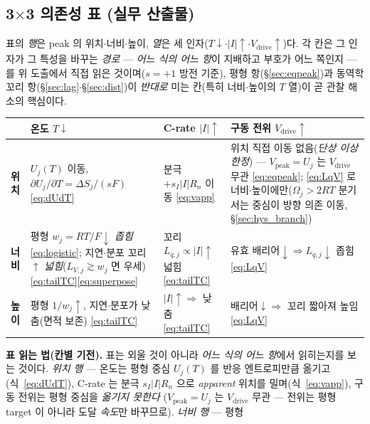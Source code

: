 \documentclass[11pt,a4paper]{article}
\newcommand{\drive}{\mathrm{drive}}
\newcommand{\peak}{\mathrm{peak}}
\begin{document}
\subsection{3$\times$3 의존성 표 (실무 산출물)}
표의 \emph{행}은 peak 의 위치$\cdot$너비$\cdot$높이, \emph{열}은 세 인자($T\downarrow$$\cdot$$|I|\uparrow$$\cdot$$V_\drive\uparrow$)다.
각 칸은 그 인자가 그 특성을 바꾸는 \emph{경로} — \emph{어느 식의 어느 항}이 지배하고 부호가 어느 쪽인지 — 를 위
도출에서 직접 읽은 것이며($s=+1$ 방전 기준), 평형 항(\S\ref{sec:eqpeak})과 동역학 꼬리 항(\S\ref{sec:lag}$\cdot$\S\ref{sec:dist})이
\emph{반대로} 미는 칸(특히 너비$\cdot$높이의 $T$ 열)이 곧 관찰 해소의 핵심이다.
\begin{center}
\renewcommand{\arraystretch}{1.4}
\begin{tabular}{p{} p{} p{} p{}}
\toprule
 & \textbf{온도 $T\downarrow$} & \textbf{C-rate $|I|\uparrow$} & \textbf{구동 전위 $V_\drive\uparrow$} \\
\midrule
\textbf{위치} & $U_j(T)$ 이동, $\partial U_j/\partial T=\Delta S_j/(sF)$ \eqref{eq:dUdT} & 분극 $+s_I|I|R_n$ 이동 \eqref{eq:vapp} & 위치 직접 이동 없음(\emph{단상 이상 한정}) — $V_\peak=U_j$ 는 $V_\drive$ 무관 \eqref{eq:eqpeak}; \eqref{eq:LqV} 로 너비$\cdot$높이에만($\Omega_j>2RT$ 분기서는 중심이 방향 의존 이동, \S\ref{sec:hys_branch}) \\
\textbf{너비} & 평형 $w_j=RT/F\downarrow$ \emph{좁힘} \eqref{eq:logistic}; 지연$\cdot$분포 꼬리 $\uparrow$ \emph{넓힘}($L_{V,j}\!\gtrsim\!w_j$ 면 우세) \eqref{eq:tailTC}\eqref{eq:superpose} & 꼬리 $L_{q,j}\propto|I|\uparrow$ 넓힘 \eqref{eq:tailTC} & 유효 배리어$\downarrow\Rightarrow L_{q,j}\downarrow$ 좁힘 \eqref{eq:LqV} \\
\textbf{높이} & 평형 $1/w_j\uparrow$, 지연$\cdot$분포가 낮춤(면적 보존) \eqref{eq:tailTC} & $|I|\uparrow\Rightarrow$ 낮춤 \eqref{eq:tailTC} & 배리어$\downarrow\Rightarrow$ 꼬리 짧아져 높임 \eqref{eq:LqV} \\
\bottomrule
\end{tabular}
\end{center}
\textbf{표 읽는 법(칸별 기전).} 표는 외울 것이 아니라 \emph{어느 식의 어느 항}에서 읽히는지를 보는 것이다.
\emph{위치 행} — 온도는 평형 중심 $U_j(T)$ 를 반응 엔트로피만큼 옮기고(식~\eqref{eq:dUdT}), C-rate 는 분극
$s_I|I|R_n$ 으로 \emph{apparent} 위치를 밀며(식~\eqref{eq:vapp}), 구동 전위는 평형 중심을 \emph{옮기지 못한다}
($V_\peak=U_j$ 는 $V_\drive$ 무관 — 전위는 평형 target 이 아니라 도달 \emph{속도}만 바꾸므로). \emph{너비 행} — 평형
\end{document}
